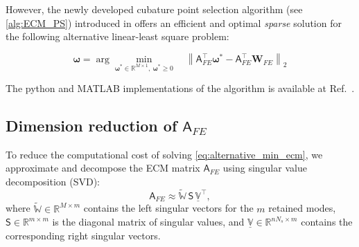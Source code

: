 \documentclass[11pt]{article}
\renewcommand{\vec}[1]{\mathbf{#1}}
\newcommand{\mat}[1]{\mathsf{#1}}
\begin{document}
            However, the newly developed cubature point selection algorithm (see \cref{alg:ECM_PS}) introduced in \cite{bravo2024subspace} offers an efficient and optimal \textit{sparse} solution for the following alternative linear-least square problem:

            \begin{equation}
            \boldsymbol{\omega} = \arg \min_{\boldsymbol{\omega^*} \in \mathbb{R}^{M\times 1},\ \boldsymbol{\omega^*} \geq 0} \quad \left\| \mat{A}_{FE}^\top \boldsymbol{\omega^*} - \mat{A}_{FE}^\top \vec{W}_{FE} \right\|_2
            \label{eq:alternative_min_ecm}
            \end{equation}




            The python and MATLAB implementations of the algorithm is available at  Ref.~\cite{ecm_python_GitHub}.


            \subsection*{Dimension reduction of $\mat{A}_{FE}$}

            To reduce the computational cost of solving \cref{eq:alternative_min_ecm}, we approximate and decompose the ECM matrix \(\mat{A}_{FE}\) using singular value decomposition (SVD):
            \begin{equation}
            \mat{A}_{FE} \approx \widetilde{\mathbb{W}}\, \mat{S}\, \underline{\mathbb{V}}^{\top},
            \end{equation}
            where \(\widetilde{\mathbb{W}} \in \mathbb{R}^{M \times m}\) contains the left singular vectors for the \(m\) retained modes, \(\mat{S} \in \mathbb{R}^{m \times m}\) is the diagonal matrix of singular values, and \(\underline{\mathbb{V}} \in \mathbb{R}^{nN_s \times m}\) contains the corresponding right singular vectors.
\end{document}
